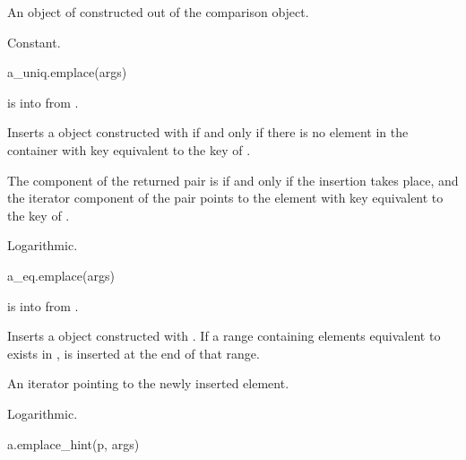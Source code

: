 \begin{itemdescr}
\pnum
\result
{}

\pnum
\returns
An object of  constructed out of the comparison object.

\pnum
\complexity
Constant.
\end{itemdescr}

%
\begin{itemdecl}
a_uniq.emplace(args)
\end{itemdecl}

\begin{itemdescr}
\pnum
\result
{}

\pnum
\expects
{} is
 into  from .

\pnum
\effects
Inserts a  object 
constructed with 
if and only if there is no element in the container
with key equivalent to the key of .

\pnum
\returns
The  component of the returned pair is 
if and only if the insertion takes place, and
the iterator component of the pair points to
the element with key equivalent to the key of .

\pnum
\complexity
Logarithmic.
\end{itemdescr}

%
\begin{itemdecl}
a_eq.emplace(args)
\end{itemdecl}

\begin{itemdescr}
\pnum
\result
{}

\pnum
\expects
{} is
 into  from .

\pnum
\effects
Inserts a  object 
constructed with .
If a range containing elements equivalent to  exists in ,
 is inserted at the end of that range.

\pnum
\returns
An iterator pointing to the newly inserted element.

\pnum
\complexity
Logarithmic.
\end{itemdescr}

%
\begin{itemdecl}
a.emplace_hint(p, args)
\end{itemdecl}

